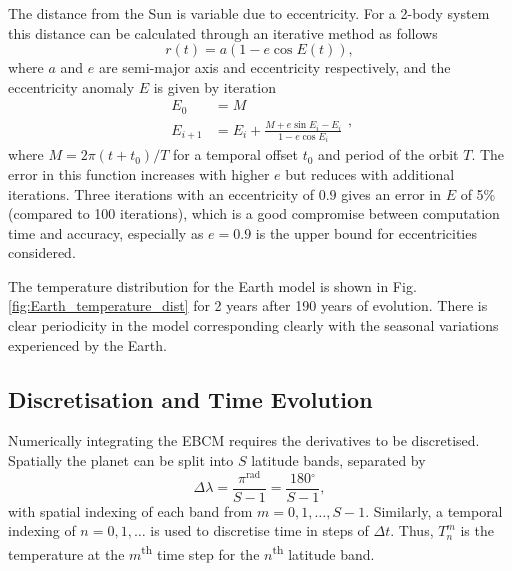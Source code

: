 \documentclass[12pt, onecolumn]{revtex4-2}    %
\newcommand{\radians}{\ensuremath{^{\text{rad}}}}
\newcommand{\degrees}{\ensuremath{^{\circ}}}
\begin{document}
The distance from the Sun is variable due to eccentricity.
For a 2-body system this distance can be calculated through an iterative method as follows
\begin{equation}
  r(t) = a (1 - e \cos E(t)), 
  \label{eq:two_body_distance}
\end{equation}
where $a$ and $e$ are semi-major axis and eccentricity respectively, and the eccentricity anomaly $E$ is given by iteration
\begin{equation}
  \begin{split}
    E_0 &= M \\
    E_{i+1} &= E_i + \frac{M + e \sin E_i - E_i}{1-e \cos E_i}
  \end{split},
  \label{eq:two_body_angle}
\end{equation}
where $M = 2\pi (t + t_0) / T$ for a temporal offset $t_0$ and period of the orbit $T$.
The error in this function increases with higher $e$ but reduces with additional iterations.
Three iterations with an eccentricity of $0.9$ gives an error in $E$ of 5\% (compared to 100 iterations), which is a good compromise between computation time and accuracy, especially as $e=0.9$ is the upper bound for eccentricities considered.

The temperature distribution for the Earth model is shown in Fig. \ref{fig:Earth_temperature_dist} for 2 years after 190 years of evolution.
There is clear periodicity in the model corresponding clearly with the seasonal variations experienced by the Earth.

\subsection{Discretisation and Time Evolution} \label{ssec:DiscretisationPDE}
%
Numerically integrating the EBCM requires the derivatives to be discretised.
Spatially the planet can be split into $S$ latitude bands, separated by
\begin{equation}
  \Delta\lambda = \frac{\pi\radians}{S-1} = \frac{180\degrees}{S-1},
  \label{eq:latitude_step}
\end{equation}
with spatial indexing of each band from $m=0, 1, \dots, S-1$.
Similarly, a temporal indexing of $n=0, 1, \dots$ is used to discretise time in steps of $\Delta t$.
Thus, $T^m_n$ is the temperature at the $m$\textsuperscript{th} time step for the $n$\textsuperscript{th} latitude band.
\end{document}
